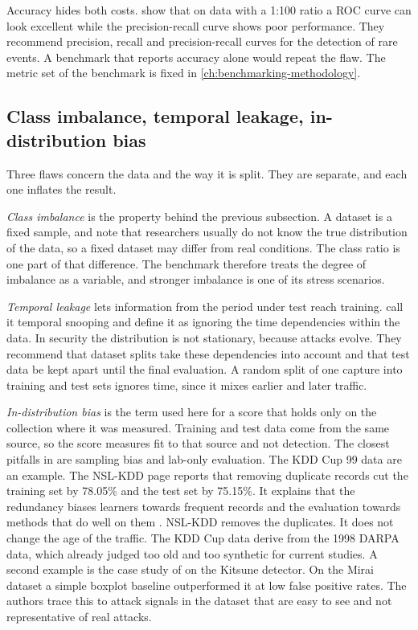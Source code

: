 Accuracy hides both costs. \citet{arp2022dosdonts} show that on data with a
1:100 ratio a ROC curve can look excellent while the precision-recall curve
shows poor performance. They recommend precision, recall and precision-recall
curves for the detection of rare events. A benchmark that reports accuracy
alone would repeat the flaw. The metric set of the benchmark is fixed in
\cref{ch:benchmarking-methodology}.

\subsection{Class imbalance, temporal leakage, in-distribution bias}
\label{sec:imbalance-leakage-bias}

Three flaws concern the data and the way it is split. They are separate, and
each one inflates the result.

\emph{Class imbalance} is the property behind the previous subsection. A
dataset is a fixed sample, and \citet{arp2022dosdonts} note that researchers
usually do not know the true distribution of the data, so a fixed dataset may
differ from real conditions. The class ratio is one part of that difference.
The benchmark therefore treats the degree of imbalance as a variable, and
stronger imbalance is one of its stress scenarios.

\emph{Temporal leakage} lets information from the period under test reach
training. \citet{arp2022dosdonts} call it temporal snooping and define it as
ignoring the time dependencies within the data. In security the distribution
is not stationary, because attacks evolve. They recommend that dataset splits
take these dependencies into account and that test data be kept apart until
the final evaluation. A random split of one capture into training and test
sets ignores time, since it mixes earlier and later traffic.

\emph{In-distribution bias} is the term used here for a score that holds
only on the collection where it was measured. Training and test data come
from the same source, so the score measures fit to that source and not
detection. The closest pitfalls in \citet{arp2022dosdonts} are sampling bias
and lab-only evaluation. The KDD Cup 99 data are an example. The NSL-KDD
page reports that removing duplicate records cut the training set by 78.05\%
and the test set by 75.15\%. It explains that the redundancy biases learners
towards frequent records and the evaluation towards methods that do well on
them \citep{cic2009nslkdd}. NSL-KDD removes the duplicates. It does not
change the age of the traffic. The KDD Cup data derive from the 1998 DARPA data, which
\citet{sommer2010outside} already judged too old and too synthetic for
current studies. A second example is the case study of
\citet{arp2022dosdonts} on the Kitsune detector. On the Mirai dataset a
simple boxplot baseline outperformed it at low false positive rates. The
authors trace this to attack signals in the dataset that are easy to see and
not representative of real attacks.

